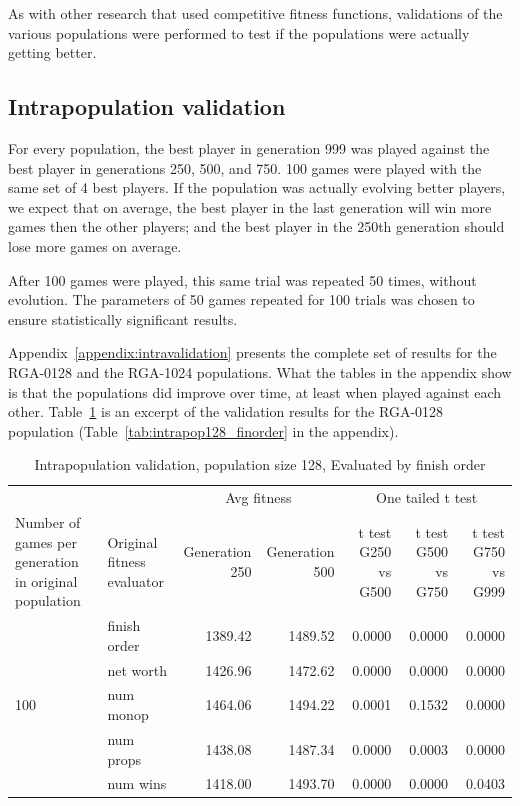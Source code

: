 As with other research that used competitive fitness functions, validations of
the various populations were performed to test if the populations were actually
getting better.

\subsection{Intrapopulation validation}

For every population, the best player in generation 999 was played against
the best player in generations 250, 500, and 750. 100 games were played with the
same set of 4 best players. If the population was actually evolving better
players, we expect that on average, the best player in the last generation will
win more games then the other players; and the best player in the 250th
generation should lose more games on average.

After 100 games were played, this same trial was repeated 50 times, without
evolution. The parameters of 50 games repeated for 100 trials was chosen to
ensure statistically significant results.

Appendix~\ref{appendix:intravalidation} presents the complete set of results for
the RGA-0128 and the RGA-1024 populations. What the tables in the appendix show
is that the populations did improve over time, at least when played against each
other. Table~\ref{tab:validationRGA0128} is an excerpt of the validation results
for the RGA-0128 population (Table~\ref{tab:intrapop128_finorder} in the
appendix).

\begin{table}[htbp]
  \centering
  \caption{Intrapopulation validation, population size 128, Evaluated by finish order}
    \begin{tabularx}{\linewidth}{|p{1in}|p{1in}|r|r|r|r|r|}
    \cline{3-7}
    \multicolumn{1}{l}{} &  & \multicolumn{2}{c|}{Avg fitness} & \multicolumn{3}{c|}{One tailed t test} \\
    \cline{1-7}
    Number of games per generation in original population
    & Original fitness evaluator
    & \multicolumn{1}{p{0.7in}|}{Generation 250}
    & \multicolumn{1}{p{0.7in}|}{Generation 500}
    & \multicolumn{1}{X|}{t test G250 vs G500}
    & \multicolumn{1}{X|}{t test G500 vs G750}
    & \multicolumn{1}{X|}{t test G750 vs G999} \\
    \cline{1-7}
      \multirow{5}{*}{100}
      & finish order & 1389.42 & 1489.52 & 0.0000 & 0.0000 & 0.0000 \\
      \cline{2-7}
      & net worth & 1426.96 & 1472.62 & 0.0000 & 0.0000 & 0.0000 \\
      \cline{2-7}
      & num monop & 1464.06 & 1494.22 & 0.0001 & 0.1532 & 0.0000 \\
      \cline{2-7}
      & num props & 1438.08 & 1487.34 & 0.0000 & 0.0003 & 0.0000 \\
      \cline{2-7}
      & num wins & 1418.00 & 1493.70 & 0.0000 & 0.0000 & 0.0403 \\
      \cline{1-7}
    \end{tabularx}%
  \label{tab:validationRGA0128}%
\end{table}%

